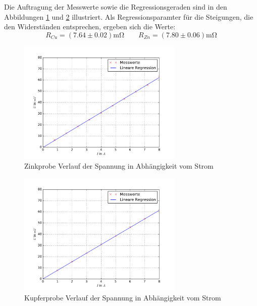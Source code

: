 Die Auftragung der Messwerte sowie die Regressionsgeraden sind in den Abbildungen \ref{fig: uri_zink} und \ref{fig: uri_kupfer} illustriert.
Als Regressionsparamter für die Steigungen, die den Widerständen entsprechen, ergeben sich die Werte:
\begin{equation}
  R_{Cu} = (7.64 \pm 0.02)\si{\milli \ohm} \quad \quad R_{Zn} = (7.80 \pm 0.06)\si{\milli \ohm}
  \label{eq: widerstand}
\end{equation}
\FloatBarrier
\begin{figure}
  \centering
  \includegraphics[width=0.7\textwidth]{pics/uri_zink.pdf}
  \caption{Zinkprobe Verlauf der Spannung in Abhängigkeit vom Strom}
  \label{fig: uri_zink}
\end{figure}
\begin{figure}
  \centering
  \includegraphics[width=0.7\textwidth]{pics/uri_kupfer.pdf}
  \caption{Kupferprobe Verlauf der Spannung in Abhängigkeit vom Strom}
  \label{fig: uri_kupfer}
\end{figure}



